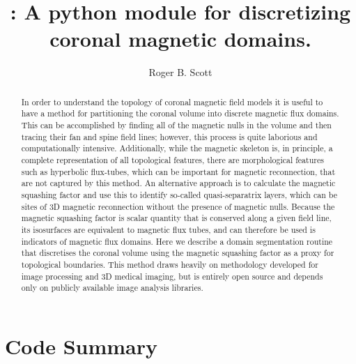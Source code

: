 \documentclass[10pt]{aastex62}
\begin{document}
\revised{\today}

\title{: A python module for discretizing coronal magnetic domains.}
\author[0000-0001-8517-4920]{Roger B. Scott} %


\begin{abstract}
In order to understand the topology of coronal magnetic field models it is useful to have a method for partitioning the coronal volume into discrete magnetic flux domains.
This can be accomplished by finding all of the magnetic nulls in the volume and then tracing their fan and spine field lines; however, this process is quite laborious and computationally intensive.
Additionally, while the magnetic skeleton is, in principle, a complete representation of all topological features, there are morphological features such as hyperbolic flux-tubes, which can be important for magnetic reconnection, that are not captured by this method.
An alternative approach is to calculate the magnetic squashing factor and use this to identify so-called quasi-separatrix layers, which can be sites of 3D magnetic reconnection without the presence of magnetic nulls.
Because the magnetic squashing factor is scalar quantity that is conserved along a given field line, its isosurfaces are equivalent to magnetic flux tubes, and can therefore be used is indicators of magnetic flux domains.
Here we describe a domain segmentation routine that discretises the coronal volume using the magnetic squashing factor as a proxy for topological boundaries.
This method draws heavily on methodology developed for image processing and 3D medical imaging, but is entirely open source and depends only on publicly available image analysis libraries.
\\
\end{abstract}

\section{Code Summary}\label{summary.sec}
\end{document}
